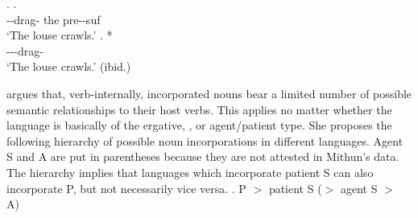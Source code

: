 \ex.
 \ag.    \\
	--drag- the {\sc pre}--{\sc suf} \\
	`The louse crawls.'
 \bg. * \\
	---drag- \\
	`The louse crawls.'
	\hfill{(ibid.)}

 argues that,
verb-internally, incorporated nouns bear a limited number of possible semantic relationships to their host verbs.
This applies no matter whether the language is basically of the ergative, , or agent/patient type.
She proposes the following hierarchy of possible noun incorporations in different languages.
Agent S and A are put in parentheses because they are not attested in Mithun's data.
The hierarchy implies that
languages which incorporate patient S can also incorporate P,
but not necessarily vice versa.
%
\ex. P $>$ patient S ($>$ agent S $>$ A)


